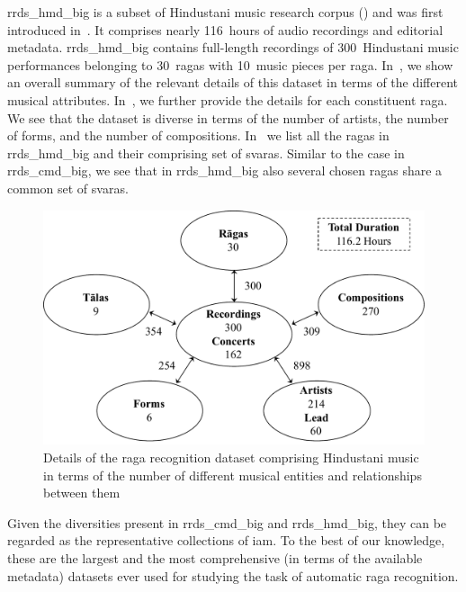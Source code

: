 {{{{\acrshort{rrds_hmd_big} is a subset of Hindustani music research corpus () and was first introduced in~\cite{gulati_tdms_2016}. It comprises nearly 116\, hours of audio recordings and editorial metadata. \acrshort{rrds_hmd_big} contains full-length recordings of 300~Hindustani music performances belonging to 30~\glspl{raga} with 10~music pieces per \gls{raga}. In~, we show an overall summary of the relevant details of this dataset in terms of the different musical attributes. In~, we  further provide the details for each constituent \gls{raga}. We see that the dataset is diverse in terms of the number of artists, the number of forms, and the number of compositions. In~ we list all the \glspl{raga} in \acrshort{rrds_hmd_big} and their comprising set of \glspl{svara}. Similar to the case in \acrshort{rrds_cmd_big}, we see that in \acrshort{rrds_hmd_big} also several chosen \glspl{raga} share a common set of \glspl{svara}. 




\begin{figure}
	\begin{center}
		\includegraphics[width=\figSizeNinety]{ch04_datasets/figures/hindustani_corpus_ragaDB.pdf}
	\end{center}
	\caption[Details of the \gls{raga} recognition dataset comprising Hindustani music]{Details of the \gls{raga} recognition dataset comprising Hindustani music in terms of the number of different musical entities and relationships between them}
	\label{fig:hindustani_ragaDB_details}
\end{figure}


Given the diversities present in \acrshort{rrds_cmd_big} and \acrshort{rrds_hmd_big}, they can be regarded as the representative collections of \gls{iam}. To the best of our knowledge, these are the largest and the most comprehensive (in terms of the available metadata) datasets ever used for studying the task of automatic \gls{raga} recognition.


}}}}
